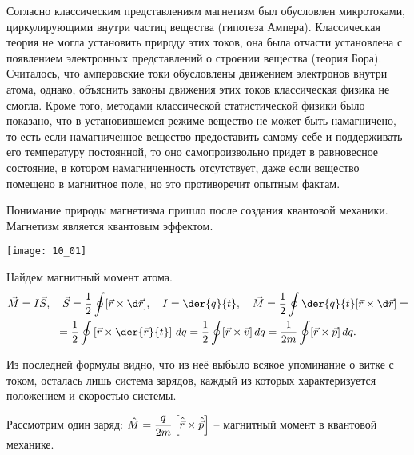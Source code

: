 
Согласно классическим представлениям магнетизм был обусловлен микротоками,
циркулирующими внутри частиц вещества (гипотеза Ампера). Классическая теория не
могла установить природу этих токов, она была отчасти установлена с появлением
электронных представлений о строении вещества (теория Бора). Считалось, что
амперовские токи обусловлены движением электронов внутри атома, однако,
объяснить законы движения этих токов классическая физика не смогла. Кроме того,
методами классической статистической физики было показано, что в установившемся
режиме вещество не может быть намагничено, то есть если намагниченное вещество
предоставить самому себе и поддерживать его температуру постоянной, то оно
самопроизвольно придет в равновесное состояние, в котором намагниченность
отсутствует, даже если вещество помещено в магнитное поле, но это противоречит
опытным фактам.

Понимание природы магнетизма пришло после создания квантовой механики. Магнетизм
является квантовым эффектом.

\begin{minipage}{.27\textwidth}
    \texttt{[image: 10\_01]}
\end{minipage}
\begin{minipage}{.68\textwidth}
    Найдем магнитный момент атома.
    \begin{gather*}
        \vec{M} = I\vec{S}, \quad \vec{S} = \frac{1}{2}\oint [\vec{r}\times\d
        \vec{r}], \quad I = \der{q}{t}, \quad \vec{M} = \frac{1}{2}\oint \der{q}{t}[\vec{r}\times\d\vec{r}] = \\
        = \frac{1}{2}\oint\left[ \vec{r}\times\der{\vec{r}}{t} \right]\,dq =
        \frac{1}{2}\oint[\vec{r}\times\vec{v}]\,dq = \frac{1}{2m}\oint
        [\vec{r}\times\vec{p}]\,dq.
    \end{gather*}

Из последней формулы видно, что из неё выбыло всякое упоминание о витке с
током, осталась лишь система зарядов, каждый из которых характеризуется
положением и скоростью системы.
\end{minipage}

Рассмотрим один заряд: \( \displaystyle \hat{M} = \frac{q}{2m}\left[\hat{\vec{r}}\times
\hat{\vec{p}}\right] \) -- магнитный момент в квантовой механике.

